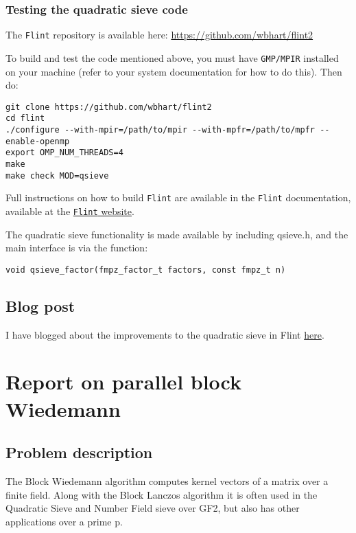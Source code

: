 \subsubsection{Testing the quadratic sieve
code}\label{testing-the-quadratic-sieve-code}

The \texttt{Flint} repository is available here:
\url{https://github.com/wbhart/flint2}

To build and test the code mentioned above, you must have
\texttt{GMP/MPIR} installed on your machine (refer to your system
documentation for how to do this). Then do:

\begin{verbatim}
git clone https://github.com/wbhart/flint2
cd flint
./configure --with-mpir=/path/to/mpir --with-mpfr=/path/to/mpfr --enable-openmp
export OMP_NUM_THREADS=4
make
make check MOD=qsieve
\end{verbatim}

Full instructions on how to build \texttt{Flint} are available in the
\texttt{Flint} documentation, available at the
\href{http://flintlib.org}{\texttt{Flint} website}.

The quadratic sieve functionality is made available by including
qsieve.h, and the main interface is via the function:

\begin{verbatim}
void qsieve_factor(fmpz_factor_t factors, const fmpz_t n)
\end{verbatim}

\subsection{Blog post}\label{blog-post}

I have blogged about the improvements to the quadratic sieve in Flint
\href{https://wbhart.blogspot.de/2017/02/integer-factorisation-in-flint.html}{here}.

\section*{Report on parallel block
Wiedemann}\label{report-on-parallel-block-wiedemann}

\subsection{Problem description}\label{problem-description-1}

The Block Wiedemann algorithm computes kernel vectors of a matrix over a
finite field. Along with the Block Lanczos algorithm it is often used in
the Quadratic Sieve and Number Field sieve over GF2, but also has other
applications over a prime p.

